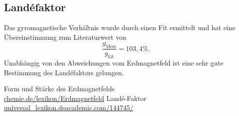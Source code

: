 \subsection{Landéfaktor}
Das gyromagnetische Verhältnis wurde durch einen Fit ermittelt und hat eine Übereinstimmung zum Literaturwert \cite{Gyro} von
\begin{equation}
 \frac{g_\text{Mess}}{g_\text{Lit}} = 103,4 \%.
\end{equation}
Unabhängig von den Abweichungen vom Erdmagnetfeld ist eine sehr gute Bestimmung des Landéfaktors gelungen. 




\begin{thebibliography}{xxxxxxxxxxxxxxxxx}
 Form und Stärke des Erdmagnetfelds\\ \href{http://www.chemie.de/lexikon/Erdmagnetfeld.html#Form_und_St.C3.A4rke_des_Erdmagnetfeldes}{chemie.de/lexikon/Erdmagnetfeld}
 Landé-Faktor\\ \href{http://universal\_lexikon.deacademic.com/144745/}{universal\_lexikon.deacademic.com/144745/}
\end{thebibliography}





